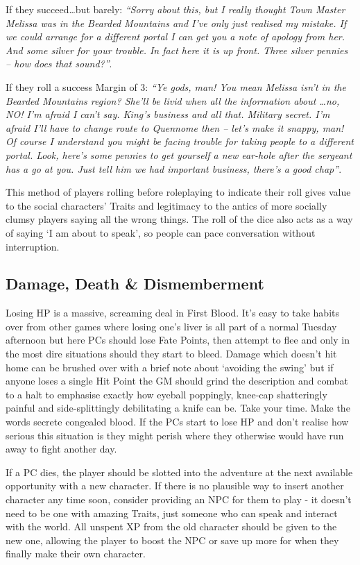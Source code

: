 If they succeed\ldots but barely: \textit{``Sorry about this, but I really thought Town Master Melissa was in the Bearded Mountains and I've only just realised my mistake.  If we could arrange for a different portal I can get you a note of apology from her.  And some silver for your trouble.  In fact here it is up front.  Three silver pennies -- how does that sound?''}.

If they roll a success Margin of 3: \textit{``Ye gods, man!  You mean Melissa isn't in the Bearded Mountains region?  She'll be livid when all the information about \dots no, NO! I'm afraid I can't say.  King's business and all that.  Military secret.  I'm afraid I'll have to change route to Quennome then -- let's make it snappy, man!  Of course I understand you might be facing trouble for taking people to a different portal.  Look, here's some pennies to get yourself a new ear-hole after the sergeant has a go at you.  Just tell him we had important business, there's a good chap''}.

This method of players rolling before roleplaying to indicate their roll gives value to the social characters' Traits and legitimacy to the antics of more socially clumsy players saying all the wrong things.  The roll of the dice also acts as a way of saying `I am about to speak', so people can pace conversation without interruption.

\subsection{Damage, Death \& Dismemberment}

Losing HP is a massive, screaming deal in First Blood.  It's easy to take habits over from other games where losing one's liver is all part of a normal Tuesday afternoon but here PCs should lose Fate Points, then attempt to flee and only in the most dire situations should they start to bleed.  Damage which doesn't hit home can be brushed over with a brief note about `avoiding the swing' but if anyone loses a single Hit Point the GM should grind the description and combat to a halt to emphasise exactly how eyeball poppingly, knee-cap shatteringly painful and side-splittingly debilitating a knife can be.  Take your time.  Make the words secrete congealed blood.  If the PCs start to lose HP and don't realise how serious this situation is they might perish where they otherwise would have run away to fight another day.

If a PC dies, the player should be slotted into the adventure at the next available opportunity with a new character. If there is no plausible way to insert another character any time soon, consider providing an NPC for them to play - it doesn't need to be one with amazing Traits, just someone who can speak and interact with the world.  All unspent XP from the old character should be given to the new one, allowing the player to boost the NPC or save up more for when they finally make their own character.

